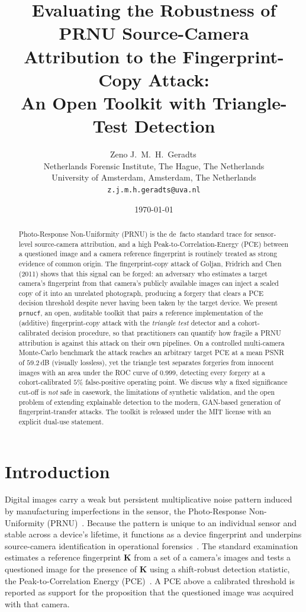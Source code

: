 \documentclass[11pt]{article}
\title{\textbf{Evaluating the Robustness of PRNU Source-Camera\\
Attribution to the Fingerprint-Copy Attack:\\
An Open Toolkit with Triangle-Test Detection}}
\author{%
Zeno J.~M.~H.~Geradts\,\orcidlink{0000-0001-5912-5295}\\
\small Netherlands Forensic Institute, The Hague, The Netherlands\\
\small University of Amsterdam, Amsterdam, The Netherlands\\
\small \texttt{z.j.m.h.geradts@uva.nl}%
}
\date{\today}
\newcommand{\K}{\mathbf{K}}
\newcommand{\code}[1]{\texttt{#1}}
\begin{document}
\maketitle

\begin{abstract}
\noindent
Photo-Response Non-Uniformity (PRNU) is the de~facto standard trace for
sensor-level source-camera attribution, and a high Peak-to-Correlation-Energy
(PCE) between a questioned image and a camera reference fingerprint is routinely
treated as strong evidence of common origin. The fingerprint-copy attack of
Goljan, Fridrich and Chen (2011) shows that this signal can be forged: an
adversary who estimates a target camera's fingerprint from that camera's
publicly available images can inject a scaled copy of it into an unrelated
photograph, producing a forgery that clears a PCE decision threshold despite
never having been taken by the target device. We present \code{prnucf}, an open,
auditable toolkit that pairs a reference implementation of the (additive)
fingerprint-copy attack with the \emph{triangle test} detector and a
cohort-calibrated decision procedure, so that practitioners can quantify how
fragile a PRNU attribution is against this attack on their own pipelines. On a
controlled multi-camera Monte-Carlo benchmark the attack reaches an arbitrary
target PCE at a mean PSNR of $59.2$\,dB (visually lossless), yet the triangle
test separates forgeries from innocent images with an area under the ROC curve
of $0.999$, detecting every forgery at a cohort-calibrated $5\%$ false-positive
operating point. We discuss why a fixed significance cut-off is \emph{not} safe
in casework, the limitations of synthetic validation, and the open problem of
extending explainable detection to the modern, GAN-based generation of
fingerprint-transfer attacks. The toolkit is released under the MIT license
with an explicit dual-use statement.
\end{abstract}

\section{Introduction}
Digital images carry a weak but persistent multiplicative noise pattern induced
by manufacturing imperfections in the sensor, the Photo-Response Non-Uniformity
(PRNU)~\cite{lukas2006}. Because the pattern is unique to an individual sensor
and stable across a device's lifetime, it functions as a device fingerprint and
underpins source-camera identification in operational forensics~\cite{chen2008}.
The standard examination estimates a reference fingerprint $\K$ from a set of a
camera's images and tests a questioned image for the presence of $\K$ using a
shift-robust detection statistic, the Peak-to-Correlation Energy
(PCE)~\cite{goljan2008}. A PCE above a calibrated threshold is reported as
support for the proposition that the questioned image was acquired with that
camera.
\end{document}
